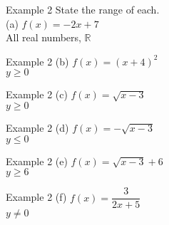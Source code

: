\documentclass[t]{beamer}
\begin{document}
\begin{frame}{Example 2}
State the range of each. \newline\\
(a) \quad $f(x) = -2x+7$	\newline\\	\pause
All real numbers, $\mathbb{R}$
\end{frame}

\begin{frame}{Example 2}
(b) \quad $f(x) = (x+4)^2$	\newline\\	\pause
$y \geq 0$
\end{frame}

\begin{frame}{Example 2}
(c) \quad $f(x) = \sqrt{x-3}$	\newline\\	\pause
$y \geq 0$
\end{frame}

\begin{frame}{Example 2}
(d) \quad $f(x) = -\sqrt{x-3}$	\newline\\	\pause
$y \leq 0$
\end{frame}

\begin{frame}{Example 2}
(e) \quad $f(x) = \sqrt{x-3} + 6$	\newline\\	\pause
$y \geq 6$
\end{frame}

\begin{frame}{Example 2}
(f) \quad $f(x) = \dfrac{3}{2x+5}$	\newline\\	\pause
$y \neq 0$
\end{frame}
\end{document}
